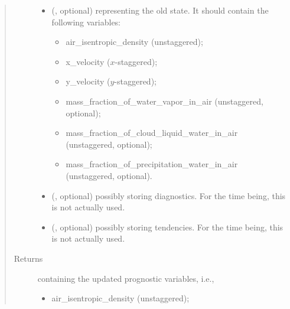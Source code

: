 \documentclass[letterpaper,10pt,english]{sphinxmanual}
\begin{document}
\begin{fulllineitems}
\begin{fulllineitems}
\begin{quote}
\begin{description}
\begin{itemize}
\begin{itemize}
\end{itemize}


\item {} 
 (, optional) \textendash{} 
{\hyperref[\detokenize{api:tasmania.storages.state_isentropic.StateIsentropic}]{}} representing the old state.
It should contain the following variables:
\begin{itemize}
\item {} 
air\_isentropic\_density (unstaggered);

\item {} 
x\_velocity (\(x\)-staggered);

\item {} 
y\_velocity (\(y\)-staggered);

\item {} 
mass\_fraction\_of\_water\_vapor\_in\_air (unstaggered, optional);

\item {} 
mass\_fraction\_of\_cloud\_liquid\_water\_in\_air (unstaggered, optional);

\item {} 
mass\_fraction\_of\_precipitation\_water\_in\_air (unstaggered, optional).

\end{itemize}


\item {} 
 (, optional) \textendash{} {\hyperref[\detokenize{api:tasmania.storages.grid_data.GridData}]{}} possibly storing diagnostics.
For the time being, this is not actually used.

\item {} 
 (, optional) \textendash{} {\hyperref[\detokenize{api:tasmania.storages.grid_data.GridData}]{}} possibly storing tendencies.
For the time being, this is not actually used.

\end{itemize}

\item[{Returns}] \leavevmode

{\hyperref[\detokenize{api:tasmania.storages.state_isentropic.StateIsentropic}]{}} containing the updated prognostic variables, i.e.,
\begin{itemize}
\item {} 
air\_isentropic\_density (unstaggered);


\end{itemize}
\end{description}
\end{quote}
\end{fulllineitems}
\end{fulllineitems}
\end{document}
